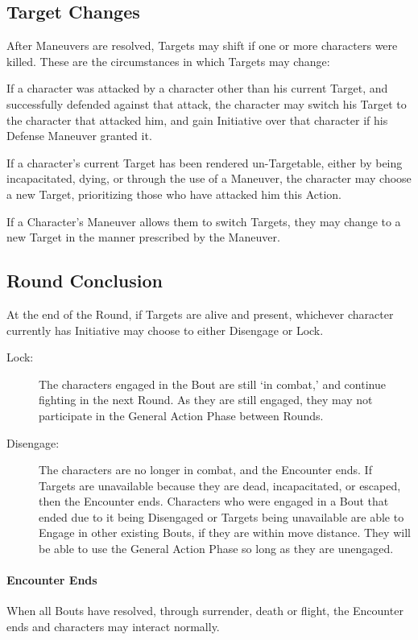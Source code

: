 \documentclass[oneside,11pt,english]{book}
\begin{document}
\subsection{Target Changes}
After Maneuvers are resolved, Targets may shift if one or more characters were killed. These are the circumstances in which Targets may change:

If a character was attacked by a character other than his current Target, and successfully defended
against that attack, the character may switch his Target to the character that attacked him, and
gain Initiative over that character if his Defense Maneuver granted it.

If a character’s current Target has been rendered un-Targetable, either by being incapacitated,
dying, or through the use of a Maneuver, the character may choose a new Target, prioritizing
those who have attacked him this Action.

If a Character’s Maneuver allows them to switch Targets, they may change to a new Target in the
manner prescribed by the Maneuver.

\subsection{Round Conclusion}
At the end of the Round, if Targets are alive and present, whichever character currently has Initiative may
choose to either Disengage or Lock.
	\begin{description}
		\item [Lock:] The characters engaged in the Bout are still `in combat,' and continue fighting in the next Round. As they are still engaged, they may not participate in the General Action Phase between Rounds.
		\item [Disengage:] The characters are no longer in combat, and the Encounter ends.
		If Targets are unavailable because they are dead, incapacitated, or escaped, then the Encounter ends.
		Characters who were engaged in a Bout that ended due to it being Disengaged or Targets being
		unavailable are able to Engage in other existing Bouts, if they are within move distance. They will be able
		to use the General Action Phase so long as they are unengaged.
	\end{description}

\paragraph{Encounter Ends}
When all Bouts have resolved, through surrender, death or flight, the Encounter ends and characters may
interact normally.
\end{document}
